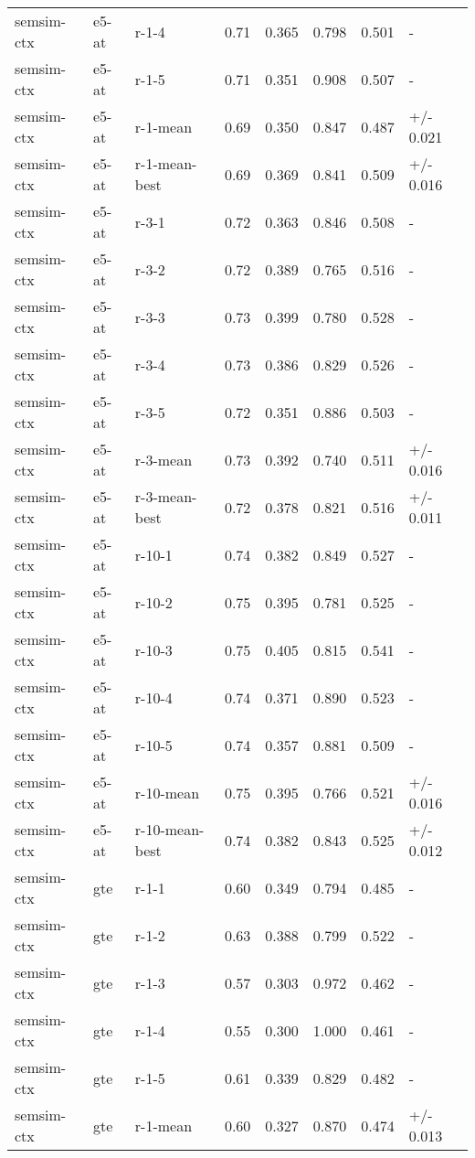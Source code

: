 \begin{tabular}{llllll}
semsim-ctx & e5-at & r-1-4 & 0.71 & 0.365 & 0.798 & 0.501 & - \\
semsim-ctx & e5-at & r-1-5 & 0.71 & 0.351 & 0.908 & 0.507 & - \\
semsim-ctx & e5-at & r-1-mean & 0.69 & 0.350 & 0.847 & 0.487 & +/- 0.021 \\
semsim-ctx & e5-at & r-1-mean-best & 0.69 & 0.369 & 0.841 & 0.509 & +/- 0.016 \\
semsim-ctx & e5-at & r-3-1 & 0.72 & 0.363 & 0.846 & 0.508 & - \\
semsim-ctx & e5-at & r-3-2 & 0.72 & 0.389 & 0.765 & 0.516 & - \\
semsim-ctx & e5-at & r-3-3 & 0.73 & 0.399 & 0.780 & 0.528 & - \\
semsim-ctx & e5-at & r-3-4 & 0.73 & 0.386 & 0.829 & 0.526 & - \\
semsim-ctx & e5-at & r-3-5 & 0.72 & 0.351 & 0.886 & 0.503 & - \\
semsim-ctx & e5-at & r-3-mean & 0.73 & 0.392 & 0.740 & 0.511 & +/- 0.016 \\
semsim-ctx & e5-at & r-3-mean-best & 0.72 & 0.378 & 0.821 & 0.516 & +/- 0.011 \\
semsim-ctx & e5-at & r-10-1 & 0.74 & 0.382 & 0.849 & 0.527 & - \\
semsim-ctx & e5-at & r-10-2 & 0.75 & 0.395 & 0.781 & 0.525 & - \\
semsim-ctx & e5-at & r-10-3 & 0.75 & 0.405 & 0.815 & 0.541 & - \\
semsim-ctx & e5-at & r-10-4 & 0.74 & 0.371 & 0.890 & 0.523 & - \\
semsim-ctx & e5-at & r-10-5 & 0.74 & 0.357 & 0.881 & 0.509 & - \\
semsim-ctx & e5-at & r-10-mean & 0.75 & 0.395 & 0.766 & 0.521 & +/- 0.016 \\
semsim-ctx & e5-at & r-10-mean-best & 0.74 & 0.382 & 0.843 & 0.525 & +/- 0.012 \\
semsim-ctx & gte & r-1-1 & 0.60 & 0.349 & 0.794 & 0.485 & - \\
semsim-ctx & gte & r-1-2 & 0.63 & 0.388 & 0.799 & 0.522 & - \\
semsim-ctx & gte & r-1-3 & 0.57 & 0.303 & 0.972 & 0.462 & - \\
semsim-ctx & gte & r-1-4 & 0.55 & 0.300 & 1.000 & 0.461 & - \\
semsim-ctx & gte & r-1-5 & 0.61 & 0.339 & 0.829 & 0.482 & - \\
semsim-ctx & gte & r-1-mean & 0.60 & 0.327 & 0.870 & 0.474 & +/- 0.013 \\

\end{tabular}
